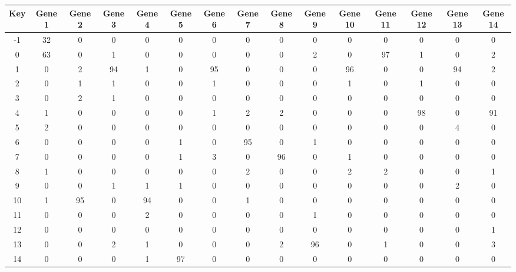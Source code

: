 \begin{tabular}{|c|c|c|c|c|c|c|c|c|c|c|c|c|c|c|}
\hline
Key & Gene 1 & Gene 2 & Gene 3 & Gene 4 & Gene 5 & Gene 6 & Gene 7 & Gene 8 & Gene 9 & Gene 10 & Gene 11 & Gene 12 & Gene 13 & Gene 14 \\
\hline
-1 & 32 & 0 & 0 & 0 & 0 & 0 & 0 & 0 & 0 & 0 & 0 & 0 & 0 & 0 \\
0 & 63 & 0 & 1 & 0 & 0 & 0 & 0 & 0 & 2 & 0 & 97 & 1 & 0 & 2 \\
1 & 0 & 2 & 94 & 1 & 0 & 95 & 0 & 0 & 0 & 96 & 0 & 0 & 94 & 2 \\
2 & 0 & 1 & 1 & 0 & 0 & 1 & 0 & 0 & 0 & 1 & 0 & 1 & 0 & 0 \\
3 & 0 & 2 & 1 & 0 & 0 & 0 & 0 & 0 & 0 & 0 & 0 & 0 & 0 & 0 \\
4 & 1 & 0 & 0 & 0 & 0 & 1 & 2 & 2 & 0 & 0 & 0 & 98 & 0 & 91 \\
5 & 2 & 0 & 0 & 0 & 0 & 0 & 0 & 0 & 0 & 0 & 0 & 0 & 4 & 0 \\
6 & 0 & 0 & 0 & 0 & 1 & 0 & 95 & 0 & 1 & 0 & 0 & 0 & 0 & 0 \\
7 & 0 & 0 & 0 & 0 & 1 & 3 & 0 & 96 & 0 & 1 & 0 & 0 & 0 & 0 \\
8 & 1 & 0 & 0 & 0 & 0 & 0 & 2 & 0 & 0 & 2 & 2 & 0 & 0 & 1 \\
9 & 0 & 0 & 1 & 1 & 1 & 0 & 0 & 0 & 0 & 0 & 0 & 0 & 2 & 0 \\
10 & 1 & 95 & 0 & 94 & 0 & 0 & 1 & 0 & 0 & 0 & 0 & 0 & 0 & 0 \\
11 & 0 & 0 & 0 & 2 & 0 & 0 & 0 & 0 & 1 & 0 & 0 & 0 & 0 & 0 \\
12 & 0 & 0 & 0 & 0 & 0 & 0 & 0 & 0 & 0 & 0 & 0 & 0 & 0 & 1 \\
13 & 0 & 0 & 2 & 1 & 0 & 0 & 0 & 2 & 96 & 0 & 1 & 0 & 0 & 3 \\
14 & 0 & 0 & 0 & 1 & 97 & 0 & 0 & 0 & 0 & 0 & 0 & 0 & 0 & 0 \\
\hline
\end{tabular}
